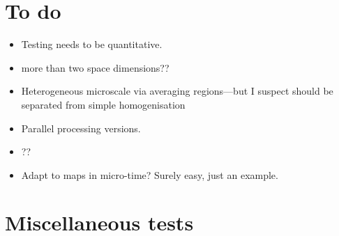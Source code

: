 


\begin{devMan}




\section{To do}
\begin{itemize}
\item Testing needs to be quantitative.
\item more than two space dimensions??
\item Heterogeneous microscale via averaging regions---but I suspect should be separated from simple homogenisation
\item Parallel processing versions.
\item ??
\item Adapt to maps in micro-time?  Surely easy, just an example.
\end{itemize}


\section{Miscellaneous tests}



\end{devMan}

